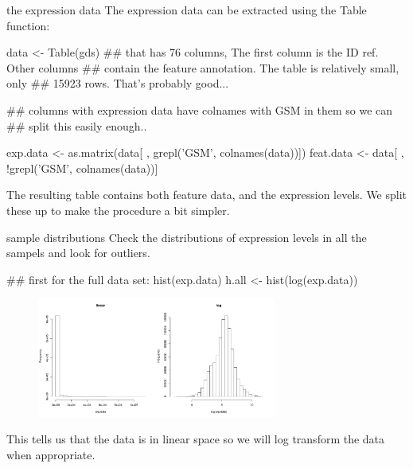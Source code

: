 \documentclass[pdf]{beamer}
\begin{document}
\begin{frame}[fragile]{the expression data}
  The expression data can be extracted using the Table
  function:
  
  \begin{rcode}
    data <- Table(gds)
    ## that has 76 columns, The first column is the ID ref. Other columns
    ## contain the feature annotation. The table is relatively small, only
    ## 15923 rows. That's probably good...
    
    ## columns with expression data have colnames with GSM in them so we can
    ## split this easily enough..
    
    exp.data <- as.matrix(data[ , grepl('GSM', colnames(data))])
    feat.data <- data[ , !grepl('GSM', colnames(data))]
  \end{rcode}
  
  The resulting table contains both feature data, and the expression levels.
  We split these up to make the procedure a bit simpler.
\end{frame}

\begin{frame}[fragile]{sample distributions}
\small
Check the distributions of expression levels in
all the sampels and look for outliers.

\begin{rcode}
  ## first for the full data set:
  hist(exp.data)
  h.all <- hist(log(exp.data))
\end{rcode}

\begin{figure}[ht]
  \includegraphics[width=0.7\textwidth]{images/all_hist}
\end{figure}
This tells us that the data is in linear space so we will log transform
the data when appropriate.
\end{frame}
\end{document}
